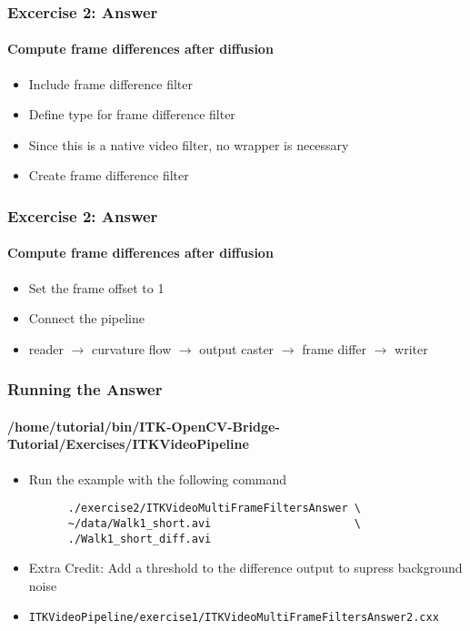 {
\begin{frame}[fragile]
\frametitle{Excercise 2: Answer}
\framesubtitle{Compute frame differences after diffusion}
\begin{itemize}
\item Include frame difference filter
\pause

\item Define type for frame difference filter
\item Since this is a native video filter, no wrapper is necessary
\pause

\item Create frame difference filter
\end{itemize}
\end{frame}
}

{
\begin{frame}[fragile]
\frametitle{Excercise 2: Answer}
\framesubtitle{Compute frame differences after diffusion}
\begin{itemize}
\item Set the frame offset to 1
\pause

\item Connect the pipeline
\item reader $\rightarrow$ curvature flow $\rightarrow$ output caster
  $\rightarrow$ frame differ $\rightarrow$ writer
\end{itemize}
\end{frame}
}

{
\begin{frame}[fragile]
\frametitle{Running the Answer}
\framesubtitle{/home/tutorial/bin/ITK-OpenCV-Bridge-Tutorial/Exercises/ITKVideoPipeline}
\begin{itemize}
\item Run the example with the following command
\begin{verbatim}
      ./exercise2/ITKVideoMultiFrameFiltersAnswer \
      ~/data/Walk1_short.avi                      \
      ./Walk1_short_diff.avi 
\end{verbatim}
\pause

\item Extra Credit: Add a threshold to the difference output to supress
  background noise
\item {\tt ITKVideoPipeline/exercise1/ITKVideoMultiFrameFiltersAnswer2.cxx}
\end{itemize}
\end{frame}
}
